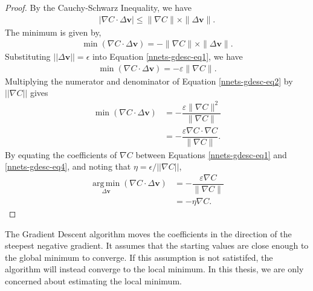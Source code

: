 \begin{proof}
	By the Cauchy-Schwarz Inequality, we have
	\begin{align}
			|\nabla C\cdot\Delta\mathbf{v}| \le \|\nabla C\|\times\|\Delta\mathbf{v}\|.
	\end{align}
	The minimum is given by,
	\begin{align}\label{nnets-gdesc-eq1}
		\min(\nabla C\cdot\Delta\mathbf{v}) = -\|\nabla C\|\times\|\Delta\mathbf{v}\|.
	\end{align}
	Substituting $||\Delta\mathbf{v}|| = \epsilon$ into Equation 	\eqref{nnets-gdesc-eq1}, we have
	\begin{align}\label{nnets-gdesc-eq2}
		\min(\nabla C\cdot\Delta\mathbf{v}) = -\varepsilon\|\nabla C\|.
	\end{align}
	Multiplying the numerator and denominator of Equation \eqref{nnets-gdesc-eq2} by $||\nabla C||$ gives
	\begin{align}\label{nnets-gdesc-eq3}
		\min(\nabla C\cdot\Delta\mathbf{v}) & = -\dfrac{\varepsilon\|\nabla C\|^2}{\|\nabla C\|}\\[1em]
		& = -\dfrac{\varepsilon\nabla C\cdot\nabla C}{\|\nabla C\|} \label{nnets-gdesc-eq4}.
	\end{align}
	By equating the coefficients of $\nabla C$ between Equations \eqref{nnets-gdesc-eq1} and \eqref{nnets-gdesc-eq4}, and noting that $\eta = \epsilon / ||\nabla C||$,
	\begin{align}
		\operatorname*{arg\,min}_{\Delta\mathbf{v}}(\nabla C\cdot\Delta\mathbf{v}) & = -\dfrac{\varepsilon\nabla C}{\|\nabla C\|} \\
		& = -\eta\nabla C.
	\end{align}	
\end{proof}

The Gradient Descent algorithm moves the coefficients in the direction of the steepest negative gradient. It assumes that the starting values are close enough to the global minimum to converge. If this assumption is not satistifed, the algorithm will instead converge to the local minimum. In this thesis, we are only concerned about estimating the local minimum.


